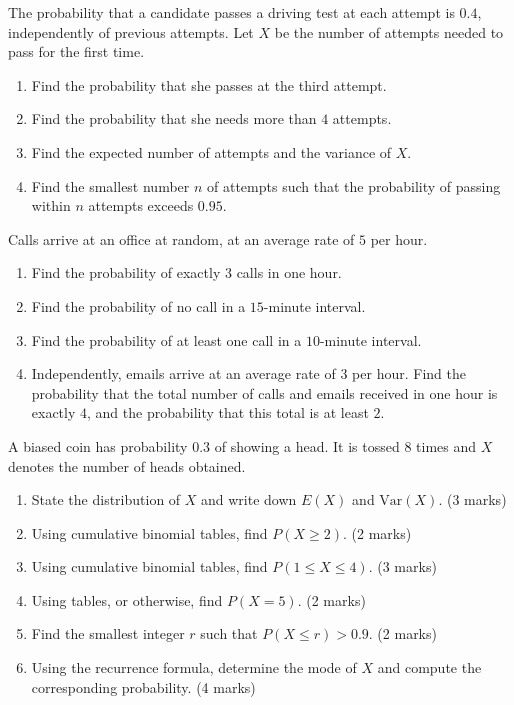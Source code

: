 \documentclass[11pt]{article}
\newcounter{popsec}
\newcounter{popsub}
\newcommand{\courssub}[1]{%
  \stepcounter{popsub}%
  \par\vspace{9pt}\noindent{\popxbold\fontsize{11.5}{13}\selectfont\color{popink}{\color{poporange}\thepopsec.\thepopsub}\hspace{6pt}#1}\par\nopagebreak\vspace{4pt}
}
\begin{document}
\begin{exercice}
The probability that a candidate passes a driving test at each attempt is $0.4$, independently of previous attempts. Let $X$ be the number of attempts needed to pass for the first time.
\begin{enumerate}
\item Find the probability that she passes at the third attempt.
\item Find the probability that she needs more than $4$ attempts.
\item Find the expected number of attempts and the variance of $X$.
\item Find the smallest number $n$ of attempts such that the probability of passing within $n$ attempts exceeds $0.95$.
\end{enumerate}
\end{exercice}

\begin{exercice}
Calls arrive at an office at random, at an average rate of $5$ per hour.
\begin{enumerate}
\item Find the probability of exactly $3$ calls in one hour.
\item Find the probability of no call in a $15$-minute interval.
\item Find the probability of at least one call in a $10$-minute interval.
\item Independently, emails arrive at an average rate of $3$ per hour. Find the probability that the total number of calls and emails received in one hour is exactly $4$, and the probability that this total is at least $2$.
\end{enumerate}
\end{exercice}

\courssub{I prepare for the GCE}

\begin{exercice}
A biased coin has probability $0.3$ of showing a head. It is tossed $8$ times and $X$ denotes the number of heads obtained.
\begin{enumerate}
\item State the distribution of $X$ and write down $E(X)$ and $\mathrm{Var}(X)$. \hfill (3 marks)
\item Using cumulative binomial tables, find $P(X \geq 2)$. \hfill (2 marks)
\item Using cumulative binomial tables, find $P(1 \leq X \leq 4)$. \hfill (3 marks)
\item Using tables, or otherwise, find $P(X = 5)$. \hfill (2 marks)
\item Find the smallest integer $r$ such that $P(X \leq r) > 0.9$. \hfill (2 marks)
\item Using the recurrence formula, determine the mode of $X$ and compute the corresponding probability. \hfill (4 marks)
\end{enumerate}
\end{exercice}
\end{document}
